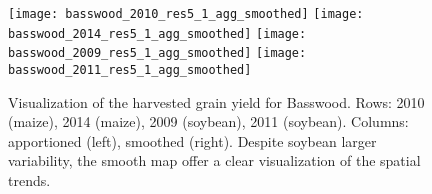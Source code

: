 \begin{figure}[H]  \centering
  \texttt{[image: basswood\_2010\_res5\_1\_agg\_smoothed]}
  \texttt{[image: basswood\_2014\_res5\_1\_agg\_smoothed]}
  \texttt{[image: basswood\_2009\_res5\_1\_agg\_smoothed]}
  \texttt{[image: basswood\_2011\_res5\_1\_agg\_smoothed]}
  \caption[Visualization of the algorithm output for one field across
  four different years]{Visualization of the harvested grain yield for
    Basswood. Rows: 2010 (maize), 2014 (maize), 2009 (soybean), 2011
    (soybean). Columns: apportioned (left), smoothed (right). Despite
    soybean larger variability, the smooth map offer a clear
    visualization of the spatial trends. }
  \label{fig:basswood-history}
\end{figure}

